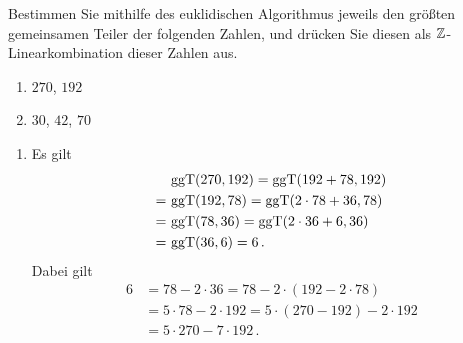 \documentclass[a4paper, 10pt]{scrartcl}
\begin{document}
\begin{question}
  Bestimmen Sie mithilfe des euklidischen Algorithmus jeweils den größten gemeinsamen Teiler der folgenden Zahlen, und drücken Sie diesen als $\mathbb{Z}$-Linearkombination dieser Zahlen aus.
  \begin{enumerate}
    \item
      $270$, $192$
    \item
      $30$, $42$, $70$
  \end{enumerate}
\end{question}

\begin{solution}
  \begin{enumerate}
    \item
      Es gilt
      \begin{align*}
         &\,  \operatorname{ggT}(270, 192)
        =     \operatorname{ggT}(192 + 78, 192)
        \\
        =&\,  \operatorname{ggT}(192, 78)
        =     \operatorname{ggT}(2 \cdot 78 + 36, 78)
        \\
        =&\,  \operatorname{ggT}(78, 36)
        =     \operatorname{ggT}(2 \cdot 36 + 6, 36)
        \\
        =&\,  \operatorname{ggT}(36, 6)
        =     6 \,.
      \end{align*}
      Dabei gilt
      \begin{align*}
            6
        &=  78 - 2 \cdot 36
        =  78 - 2 \cdot (192 - 2 \cdot 78)
        \\
        &=  5 \cdot 78 - 2 \cdot 192
        =  5 \cdot (270 - 192) - 2 \cdot 192
        \\
        &=  5 \cdot 270 - 7 \cdot 192 \,.
      \end{align*}
      

\end{enumerate}
\end{solution}
\end{document}
